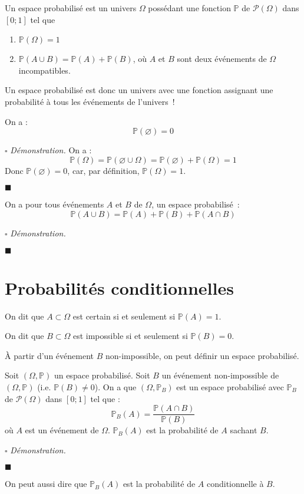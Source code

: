 \documentclass[a4paper, titlepage]{article}
\renewenvironment{proof}{$\square$ \footnotesize\textit{Démonstration.}}{\begin{flushright}$\blacksquare$\end{flushright}}
\begin{document}
	\begin{defn}
		Un espace probabilisé est un univers $\Omega$ possédant une fonction $\mathbb{P}$ de $\mathcal{P}(\Omega)$ dans $[0;1]$ tel que
		\begin{enumerate}
			\item $\mathbb{P}(\Omega)=1$
			\item $\mathbb{P}(A\cup B)=\mathbb{P}(A)+\mathbb{P}(B)$, où $A$ et $B$ sont deux événements de $\Omega$ incompatibles.
		\end{enumerate}
	\end{defn}
	Un espace probabilisé est donc un univers avec une fonction assignant une probabilité à tous les événements de l'univers~!
	\begin{props}
		On a :
		$$ \mathbb{P}(\varnothing) = 0 $$
	\end{props}
	\begin{proof}
		On a :
		$$ \mathbb{P}(\Omega) = \mathbb{P}(\varnothing\cup\Omega) = \mathbb{P}(\varnothing) + \mathbb{P}(\Omega) = 1 $$
		Donc $\mathbb{P}(\varnothing) = 0$, car, par définition, $\mathbb{P}(\Omega) = 1$.
	\end{proof}
	\begin{props}
		On a pour tous événements $A$ et $B$ de $\Omega$, un espace probabilisé~:
		$$ \mathbb{P}(A\cup B) = \mathbb{P}(A) + \mathbb{P}(B) + \mathbb{P}(A\cap B) $$
	\end{props}
	\begin{proof}
		\AQT
	\end{proof}
	\section{Probabilités conditionnelles}
	\begin{defn}
		On dit que $A\subset\Omega$ est certain si et seulement si $\mathbb{P}(A) = 1$.

		On dit que $B\subset\Omega$ est impossible si et seulement si $\mathbb{P}(B) = 0$.
	\end{defn}
	\begin{props}
		À partir d'un événement $B$ non-impossible, on peut définir un espace probabilisé.

		Soit $(\Omega,\mathbb{P})$ un espace probabilisé. Soit $B$ un événement non-impossible de $(\Omega,\mathbb{P})$ (i.e. $\mathbb{P}(B)\neq 0$). On a que $(\Omega,\mathbb{P}_B)$ est un espace probabilisé avec $\mathbb{P}_B$ de $\mathcal{P}(\Omega)$ dans $[0;1]$ tel que :
		$$ \mathbb{P}_B(A) = \frac{\mathbb{P}(A\cap B)}{\mathbb{P}(B)} $$
		où $A$ est un événement de $\Omega$. $\mathbb{P}_B(A)$ est la probabilité de $A$ sachant $B$.
	\end{props}
	\begin{proof}
		\AQT
	\end{proof}
	On peut aussi dire que $\mathbb{P}_B(A)$ est la probabilité de $A$ conditionnelle à $B$. 
\end{document}
